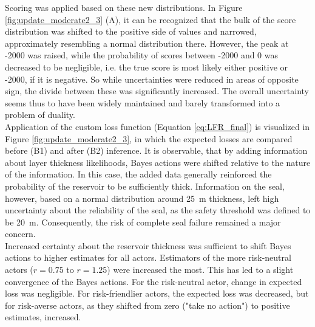 				Scoring was applied based on these new distributions. In Figure \ref{fig:update_moderate2_3} (A), it can be recognized that the bulk of the score distribution was shifted to the positive side of values and narrowed, approximately resembling a normal distribution there. However, the peak at -2000 was raised, while the probability of scores between -2000 and 0 was decreased to be negligible, i.e. the true score is most likely either positive or -2000, if it is negative. So while uncertainties were reduced in areas of opposite sign, the divide between these was significantly increased. The overall uncertainty seems thus to have been widely maintained and barely transformed into a problem of duality.\\
				Application of the custom loss function (Equation \ref{eq:LFR_final}) is visualized in Figure \ref{fig:update_moderate2_3}, in which the expected losses are compared before (B1) and after (B2) inference. It is observable, that by adding information about layer thickness likelihoods, Bayes actions were shifted relative to the nature of the information. In this case, the added data generally reinforced the probability of the reservoir to be sufficiently thick. Information on the seal, however, based on a normal distribution around 25~m thickness, left high uncertainty about the reliability of the seal, as the safety threshold was defined to be 20~m. Consequently, the risk of complete seal failure remained a major concern.\\				
				Increased certainty about the reservoir thickness was sufficient to shift Bayes actions to higher estimates for all actors. Estimators of the more risk-neutral actors ($r = 0.75$ to $r=1.25$) were increased the most. This has led to a slight convergence of the Bayes actions. For the risk-neutral actor, change in expected loss was negligible. For risk-friendlier actors, the expected loss was decreased, but for risk-averse actors, as they shifted from zero ("take no action") to positive estimates, increased.\\	
								
